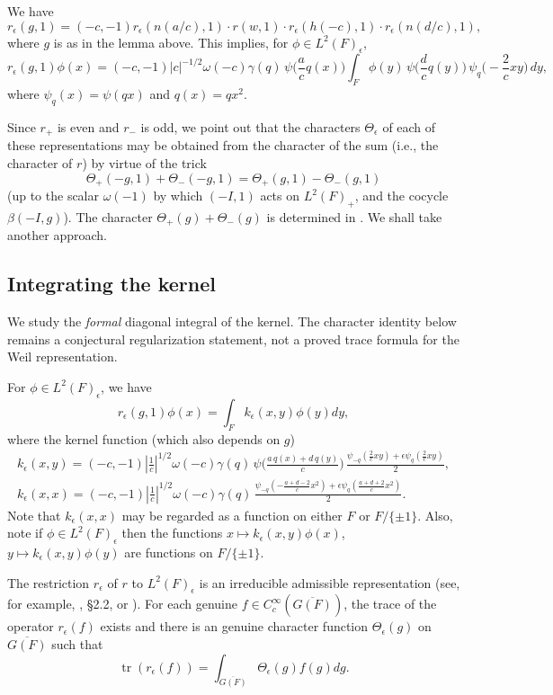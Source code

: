 \documentclass[12pt,letterpaper,openany]{book}
\theoremstyle{plain}
\theoremstyle{definition}
\theoremstyle{remark}
\theoremstyle{remark}
\newcommand{\tr}{\operatorname{tr}}
\begin{document}
We have
\[
r_\epsilon(g,1)=(-c,-1)
r_\epsilon(n(a/c),1)\cdot r(w,1)\cdot r_\epsilon(h(-c),1)
\cdot r_\epsilon(n(d/c),1),
\]
where $g$ is as in the lemma above. This implies, for $\phi\in L^2(F)_\epsilon$,
\[
r_\epsilon(g,1)\phi(x)=(-c,-1)|c|^{-1/2}\omega(-c)\gamma(q)\,
\psi\bigl({\textstyle\frac{a}{c}}q(x)\bigr)
\int_F\phi(y)\,\psi\bigl({\textstyle\frac{d}{c}}q(y)\bigr)\,
\psi_q\bigl(-{\textstyle\frac{2}{c}}xy\bigr)\,dy ,
\]
where $\psi_q(x)=\psi(qx)$ and $q(x)=qx^2$.

Since $r_+$ is even and $r_-$ is odd, we point out that
the characters $\Theta_\epsilon$ of each of these
representations may be obtained from the
character of the sum (i.e., the character of $r$)
by virtue of the trick
\[
\Theta_+(-g,1)+\Theta_-(-g,1)=
\Theta_+(g,1)-\Theta_-(g,1)
\]
(up to the scalar $\omega(-1)$ by which $(-I,1)$ acts on $L^2(F)_+$, and the
cocycle $\beta(-I,g)$). The character $\Theta_+(g)+\Theta_-(g)$ is determined in \cite{H}.
We shall take another approach.

\subsection{Integrating the kernel}

We study the \emph{formal} diagonal integral of the kernel. The
character identity below remains a conjectural regularization statement,
not a proved trace formula for the Weil representation.


For $\phi\in L^2(F)_\epsilon$, we have
\[
r_\epsilon(g,1)\phi(x)=
\int_{F}
k_\epsilon (x,y)\phi(y)dy,
\]
where the kernel function (which also depends on $g$)
\[
\begin{array}{c}
k_\epsilon (x,y)=
(-c,-1)|{\frac{1}{c}}|^{1/2}
\omega(-c)\gamma(q)\,\psi\bigl({\frac{a\,q(x)+d\,q(y)}{c}}\bigr)\,
{\frac{\psi_{-q}({\frac{2}{c}}xy)+\epsilon \psi_q({\frac{2}{c}}xy)}{2}},\\[1ex]
k_\epsilon (x,x)=(-c,-1)|{\frac{1}{c}}|^{1/2}
\omega(-c)\gamma(q)\,
{\frac{\psi_{-q}(-{\frac{a+d-2}{c}}x^2)+\epsilon \psi_q({\frac{a+d+2}{c}}x^2)}{2}} .
\end{array}
\]
Note that $k_\epsilon(x,x)$ may be regarded as a function on either
$F$ or $F/\{\pm 1\}$.
Also, note if $\phi\in L^2(F)_\epsilon$ then
the functions $x\longmapsto k_\epsilon(x,y)\phi(x)$,
$y\longmapsto k_\epsilon(x,y)\phi(y)$ are
functions on $F/\{\pm 1\}$.

The restriction $r_\epsilon$ of $r$ to $L^2(F)_\epsilon$
is an irreducible admissible representation (see, for example,
\cite{Fl}, \S 2.2, or \cite{Ge2}). For each genuine $f\in C_c^\infty(\overline{G(F)})$,
the trace of the operator $r_\epsilon(f)$ exists and there is an
genuine character function $\Theta_\epsilon(g)$ on $\overline{G(F)}$
such that
\[
\tr(r_\epsilon(f))=\int_{\overline{G(F)}} \Theta_\epsilon (g)f(g)dg.
\]
\end{document}

